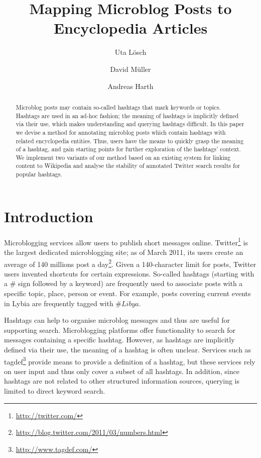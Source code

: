 \documentclass{llncs}
\title{Mapping Microblog Posts to Encyclopedia Articles}
\author{Uta L\"{o}sch \and David M\"{u}ller \and Andreas Harth}
\institute{Institute AIFB, Karlsruhe Institute of Technology (KIT), Germany\\ 
	\email{uta.loesch@kit.edu},\\
	\email{david.mueller@student.kit.edu},\\
	\email{harth@kit.edu}
}
\newcommand{\nop}[1]{}
\begin{document}
\maketitle

\begin{abstract}
Microblog posts may contain so-called hashtags that mark keywords or topics.
Hashtags are used in an ad-hoc fashion; the meaning of hashtags is implicitly defined via their use, which makes understanding and querying hashtags difficult.
In this paper we devise a method for annotating microblog posts which contain hashtags with related encyclopedia entities.
Thus, users have the means to quickly grasp the meaning of a hashtag, and gain starting points for further exploration of the hashtags' context.
We implement two variants of our method based on an existing system for linking content to Wikipedia and analyse the stability of annotated  Twitter search results for popular hashtags.
\end{abstract}

\nop{
Keywords: Twitter, Wikipedia, DBpedia, RDF

http://tagdef.com/ has a list of popular tags
}

\section{Introduction}

Microblogging services allow users to publish short messages online.
Twitter\footnote{\url{http://twitter.com/}} is the largest dedicated microblogging site; as of March 2011, its users create an average of 140 millions post a day\footnote{\url{http://blog.twitter.com/2011/03/numbers.html}}.
Given a 140-character limit for posts, Twitter users invented shortcuts for certain expressions.
So-called hashtags (starting with a \# sign followed by a keyword) are frequently used to associate posts with a specific topic, place, person or event.
For example, posts covering current events in Lybia are frequently tagged with $\#Libya$.

Hashtags can help to organise microblog messages and thus are useful for supporting search.
Microblogging platforms offer functionality to search for messages containing a specific hashtag.
However, as hashtags are implicitly defined via their use, the meaning of a hashtag is often unclear.
Services such as tagdef\footnote{\url{http://www.tagdef.com/}} provide means to provide a definition of a hashtag, but these services rely on user input and thus only cover a subset of all hashtags.
In addition, since hashtags are not related to other structured information sources, querying is limited to direct keyword search.
\end{document}
